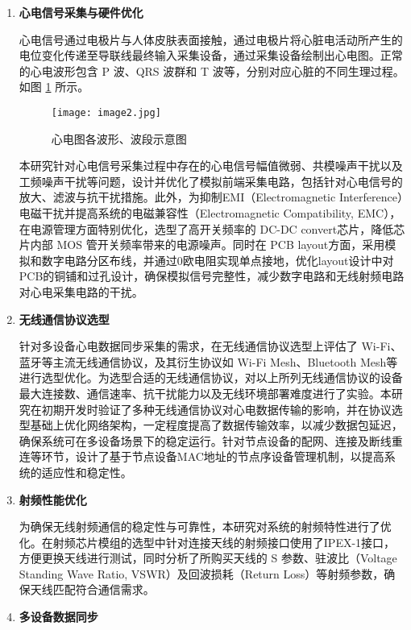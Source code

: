 \begin{enumerate}
    \item \textbf{心电信号采集与硬件优化}
    
    心电信号通过电极片与人体皮肤表面接触，通过电极片将心脏电活动所产生的电位变化传递至导联线最终输入采集设备，通过采集设备绘制出心电图。正常的心电波形包含 P 波、QRS 波群和 T 波等，分别对应心脏的不同生理过程。如图 \ref{F.ECG_image2} 所示。

    \begin{figure}[hbt]
        \centering
        \texttt{[image: image2.jpg]}
        \caption{心电图各波形、波段示意图}
        \label{F.ECG_image2}
    \end{figure}
    
    本研究针对心电信号采集过程中存在的心电信号幅值微弱、共模噪声干扰以及工频噪声干扰等问题，设计并优化了模拟前端采集电路，包括针对心电信号的放大、滤波与抗干扰措施。此外，为抑制EMI（Electromagnetic Interference）电磁干扰并提高系统的电磁兼容性（Electromagnetic Compatibility, EMC），在电源管理方面特别优化，选型了高开关频率的 DC-DC convert芯片，降低芯片内部 MOS 管开关频率带来的电源噪声。同时在 PCB layout方面，采用模拟和数字电路分区布线，并通过0欧电阻实现单点接地，优化layout设计中对PCB的铜铺和过孔设计，确保模拟信号完整性，减少数字电路和无线射频电路对心电采集电路的干扰。

    \item \textbf{无线通信协议选型}
    
    针对多设备心电数据同步采集的需求，在无线通信协议选型上评估了 Wi-Fi、蓝牙等主流无线通信协议，及其衍生协议如 Wi-Fi Mesh、Bluetooth Mesh等进行选型优化。为选型合适的无线通信协议，对以上所列无线通信协议的设备最大连接数、通信速率、抗干扰能力以及无线环境部署难度进行了实验。本研究在初期开发时验证了多种无线通信协议对心电数据传输的影响，并在协议选型基础上优化网络架构，一定程度提高了数据传输效率，以减少数据包延迟，确保系统可在多设备场景下的稳定运行。针对节点设备的配网、连接及断线重连等环节，设计了基于节点设备MAC地址的节点序设备管理机制，以提高系统的适应性和稳定性。

    \item \textbf{射频性能优化}  
    
    为确保无线射频通信的稳定性与可靠性，本研究对系统的射频特性进行了优化。在射频芯片模组的选型中针对连接天线的射频接口使用了IPEX-1接口，方便更换天线进行测试，同时分析了所购买天线的 S 参数、驻波比（Voltage Standing Wave Ratio, VSWR）及回波损耗（Return Loss）等射频参数，确保天线匹配符合通信需求。

    \item \textbf{多设备数据同步}  
    

\end{enumerate}
